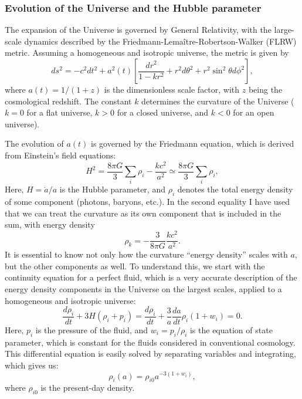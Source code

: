 \documentclass{aa}
\numberwithin{equation}{section}
\numberwithin{table}{section}
\numberwithin{figure}{section}
\begin{document}
\subsubsection{Evolution of the Universe and the Hubble parameter}\label{subsubsec: I theory evolution}
The expansion of the Universe is governed by General Relativity, with the large-scale dynamics described by the Friedmann-Lemaître-Robertson-Walker (FLRW) metric. Assuming a homogeneous and isotropic universe, the metric is given by
\begin{equation}
    ds^2 = -c^2 dt^2 + a^2(t) \left[ \frac{dr^2}{1 - k r^2} + r^2 d\theta^2 + r^2 \sin^2\theta d\phi^2 \right],
\end{equation}
where $a(t) = 1/(1+z)$ is the dimensionless scale factor, with $z$ being the cosmological redshift. The constant $k$ determines the curvature of the Universe ($k = 0$ for a flat universe, $k > 0$ for a closed universe, and $k < 0$ for an open universe). 

The evolution of $a(t)$ is governed by the Friedmann equation, which is derived from Einstein's field equations:
\begin{equation}
    H^2 = \frac{8\pi G}{3} \sum_{i}\rho_i - \frac{k c^2}{a^2} \simeq \frac{8\pi G}{3} \sum_{i}\rho_i,
\end{equation}
Here, $H = \dot{a}/a$ is the Hubble parameter, and $\rho_i$ denotes the total energy density of some component (photons, baryons, etc.). In the second equality I have used that we can treat the curvature as its own component that is included in the sum, with energy density
\begin{equation}
  \rho_k = -\frac{3}{8\pi G}\frac{k c^2}{a^2}. \label{eq:rho k}
\end{equation}
It is essential to know not only how the curvature ``energy density'' scales with $a$, but the other components as well. To understand this, we start with the continuity equation for a perfect fluid, which is a very accurate description of the energy density components in the Universe on the largest scales, applied to a homogeneous and isotropic universe:
\begin{equation}
  \frac{d\rho_i}{dt} + 3H (\rho_i+ p_i) = \frac{d\rho_i}{dt} + \frac{3}{a}\frac{da}{dt} \rho_i(1 + w_i) = 0.
\end{equation}
Here, $p_i$ is the pressure of the fluid, and $w_i=p_i/\rho_i$ is the equation of state parameter, which is constant for the fluids considered in conventional cosmology. This differential equation is easily solved by separating variables and integrating, which gives us:
\begin{equation}
  \rho_i(a) = \rho_{i0} a^{-3(1+w_i)},
\end{equation}
where $\rho_{i0}$ is the present-day density.
\end{document}
